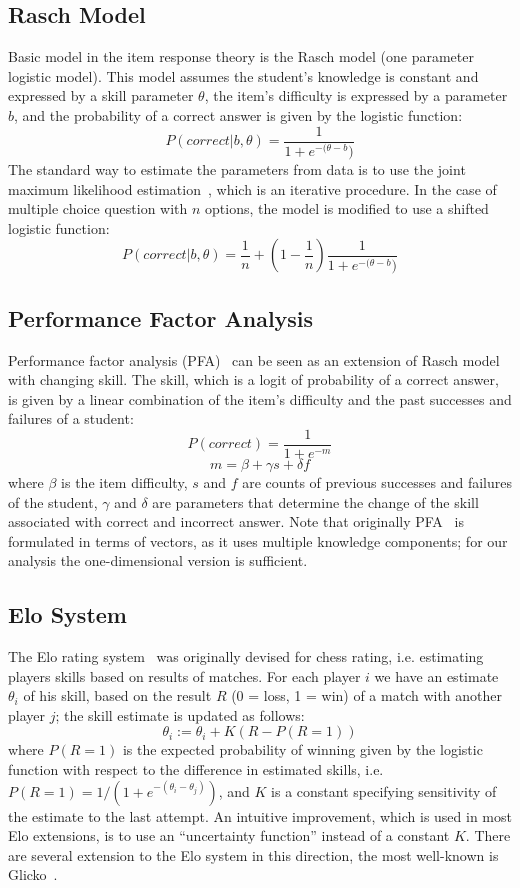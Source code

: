 \documentclass{edm_template}
\begin{document}
\subsection{Rasch Model}

Basic model in the item response theory is the Rasch model (one parameter logistic
model). This model assumes the student's knowledge is constant and
expressed by a skill parameter $\theta$, the item's difficulty is expressed by a
parameter $b$, and the probability of a correct answer is given by the logistic
function:
\[ P(\mathit{correct}|b,\theta) = \frac{1}{1+e^{-(\theta-b})} \]
The standard way to estimate the parameters from data is to use the joint maximum
likelihood estimation~\cite{de2008theory}, which is an iterative procedure. In
the case of multiple choice question with $n$ options, the model is modified to
use a shifted logistic function:
\[ P(\mathit{correct}|b,\theta) = \frac{1}{n} +
(1-\frac{1}{n})\frac{1}{1+e^{-(\theta-b})} \]

\subsection{Performance Factor Analysis}

Performance factor analysis (PFA)~\cite{pavlik2009performance} can be seen as
an extension of Rasch model with changing skill. The skill, which is a logit of
probability of a correct answer, is given by a linear combination of the item's
difficulty and the past successes and failures of a student:
\[ P(\mathit{correct}) = \frac{1}{1+e^{-m}} \]
\[ m = \beta + \gamma s + \delta f \] where $\beta$ is the item difficulty, $s$
and $f$ are counts of previous successes and failures of the student, $\gamma$
and $\delta$ are parameters that determine the change of the skill associated with
correct and incorrect answer. Note that originally
PFA~\cite{pavlik2009performance} is formulated in terms of vectors, as it uses
multiple knowledge components; for our analysis the one-dimensional version is
sufficient.

\subsection{Elo System}

The Elo rating system~\cite{elo1978rating} was originally devised for chess
rating, i.e. estimating players skills based on results of matches. For each
player $i$ we have an estimate $\theta_i$ of his skill, based on the result $R$
(0 = loss, 1 = win) of a match with another player $j$; the skill estimate is
updated as follows:
\[ \theta_i := \theta_i + K(R-P(R=1))\] where $P(R=1)$ is the expected
probability of winning given by the logistic function with respect to the
difference in estimated skills, i.e. $P(R=1) = 1/(1+e^{-(\theta_i-\theta_j)})$,
and $K$ is a constant specifying sensitivity of the estimate to the last
attempt. An intuitive improvement, which is used in most Elo extensions, is to
use an ``uncertainty function'' instead of a constant $K$. There are several
extension to the Elo system in this direction, the most well-known is
Glicko~\cite{glickman1999parameter}.
\end{document}

